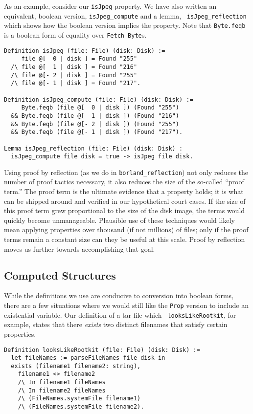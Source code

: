 \documentclass[nocopyrightspace,preprint]{sigplanconf}
\begin{document}
As an example, consider our {\tt isJpeg} property. We have also written an
equivalent, boolean version, {\tt isJpeg\_compute} and a lemma, {\tt
isJpeg\_reflection} which shows how the boolean version implies the property.
Note that {\tt Byte.feqb} is a boolean form of equality over {\tt Fetch
Byte}s.

\begin{lstlisting}
Definition isJpeg (file: File) (disk: Disk) :=
     file @[  0 | disk ] = Found "255"
  /\ file @[  1 | disk ] = Found "216"
  /\ file @[- 2 | disk ] = Found "255"
  /\ file @[- 1 | disk ] = Found "217".

Definition isJpeg_compute (file: File) (disk: Disk) :=
     Byte.feqb (file @[  0 | disk ]) (Found "255")
  && Byte.feqb (file @[  1 | disk ]) (Found "216")
  && Byte.feqb (file @[- 2 | disk ]) (Found "255")
  && Byte.feqb (file @[- 1 | disk ]) (Found "217").

Lemma isJpeg_reflection (file: File) (disk: Disk) :
  isJpeg_compute file disk = true -> isJpeg file disk.
\end{lstlisting}

Using proof by reflection (as we do in {\tt borland\_reflection}) not only
reduces the number of proof tactics necessary, it also reduces the size of the
so-called ``proof term.'' The proof term is the ultimate evidence that a
property holds; it is what can be shipped around and verified in our
hypothetical court cases. If the size of this proof term grew proportional to
the size of the disk image, the terms would quickly become unmanageable. Plausible use of these techniques would likely mean applying properties over
thousand (if not millions) of files; only if the proof terms remain a constant
size can they be useful at this scale. Proof by reflection moves us further
towards accomplishing that goal.

\subsection{Computed Structures}

While the definitions we use are conducive to conversion into boolean forms,
there are a few situations where we would still like the {\tt Prop} version to
include an existential variable. Our definition of a tar file which {\tt
looksLikeRootkit}, for example, states that there {\em exists} two distinct
filenames that satisfy certain properties.

\begin{lstlisting}
Definition looksLikeRootkit (file: File) (disk: Disk) :=
  let fileNames := parseFileNames file disk in
  exists (filename1 filename2: string),
    filename1 <> filename2
    /\ In filename1 fileNames
    /\ In filename2 fileNames
    /\ (FileNames.systemFile filename1)
    /\ (FileNames.systemFile filename2).
\end{lstlisting}
\end{document}

